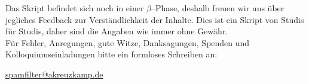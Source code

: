 \documentclass[a4paper,10pt,listof=totocnumbered,headsepline,twoside,abstracton, titlepage=false]{scrreprt}
\begin{document}
Das Skript befindet sich noch in einer $\beta$--Phase, deshalb freuen wir uns über jegliches Feedback zur Verständlichkeit der Inhalte. Dies ist ein Skript von Studis für Studis, daher sind die Angaben wie immer ohne Gewähr. \\

Für Fehler, Anregungen, gute Witze, Danksagungen, Spenden und Kolloquiumseinladungen bitte ein formloses Schreiben an: 

\href{spamfilter@akreuzkamp.de}{spamfilter@akreuzkamp.de}

\tableofcontents





















\end{document}

